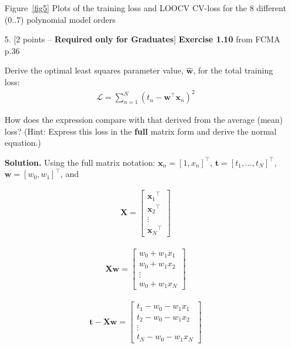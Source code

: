 \documentclass[10pt]{article}
\begin{document}
\begin{itemize}
Figure~\ref{fig5} Plots of the training loss and LOOCV CV-loss for the 8 different (0..7) polynomial model orders 

\item[5.] [2 points -- {\bf Required only for Graduates}] 
{\bf Exercise 1.10} from FCMA p.36

Derive the optimal least squares parameter value, $\mathbf{\hat{w}}$, for the total training loss:
\begin{eqnarray*}
\mathcal{L} = \sum_{n=1}^N \left( t_n - \mathbf{w}^\top \mathbf{x}_n \right)^2
\end{eqnarray*}

How does the expression compare with that derived from the average (mean) loss?  (Hint: Express this loss in the {\bf full} matrix form and derive the normal equation.)

{\bf Solution.} Using the full matrix notation:
$\mathbf{x}_n = {[ 1 , x_{n} ]}^\top$, $\mathbf{t} = {[ t_1,...,t_N ]}^\top$, $\mathbf{w} = {[ w_0, w_1 ]}^\top$, and
 
\begin{eqnarray*}
\mathbf{X} = 
    \begin{bmatrix}
    {\mathbf{x}_{1}}^\top \\[0.3em]
    {\mathbf{x}_{2}}^\top \\[0.3em]
    \vdots \\[0.3em]
    {\mathbf{x}_{N}}^\top
    \end{bmatrix}
\end{eqnarray*}

\begin{eqnarray*}
\mathbf{X}\mathbf{w} = 
	\begin{bmatrix}
    w_0 + w_1 x_1 \\[0.3em]
    w_0 + w_1 x_2\\[0.3em]
   
    \vdots \\[0.3em]
    w_0 + w_1 x_{N}
    \end{bmatrix}
\end{eqnarray*}

\begin{eqnarray*}
\mathbf{t} - \mathbf{X}\mathbf{w} = 
	\begin{bmatrix}
    t_1 - w_0 - w_1 x_1 \\[0.3em]
    t_2 - w_0 - w_1 x_2\\[0.3em]
   
    \vdots \\[0.3em]
    t_N - w_0 - w_1 x_{N}
    \end{bmatrix}
\end{eqnarray*}


\end{itemize}
\end{document}
